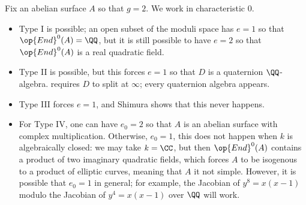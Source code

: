 \documentclass[../notes.tex]{subfiles}
\begin{document}
\begin{example}
	Fix an abelian surface $A$ so that $g=2$. We work in characteristic $0$.
	\begin{itemize}
		\item Type I is possible; an open subset of the moduli space has $e=1$ so that $\op{End}^0(A)=\QQ$, but it is still possible to have $e=2$ so that $\op{End}^0(A)$ is a real quadratic field.
		\item Type II is possible, but this forces $e=1$ so that $D$ is a quaternion $\QQ$-algebra.  requires $D$ to split at $\infty$; every quaternion algebra appears.
		\item Type III forces $e=1$, and Shimura shows that this never happens.
		\item For Type IV, one can have $e_0=2$ so that $A$ is an abelian surface with complex multiplication. Otherwise, $e_0=1$, this does not happen when $k$ is algebraically closed: we may take $k=\CC$, but then $\op{End}^0(A)$ contains a product of two imaginary quadratic fields, which forces $A$ to be isogenous to a product of elliptic curves, meaning that $A$ it not simple. However, it is possible that $e_0=1$ in general; for example, the Jacobian of $y^8=x(x-1)$ modulo the Jacobian of $y^4=x(x-1)$ over $\QQ$ will work.
	\end{itemize}
\end{example}
\end{document}
